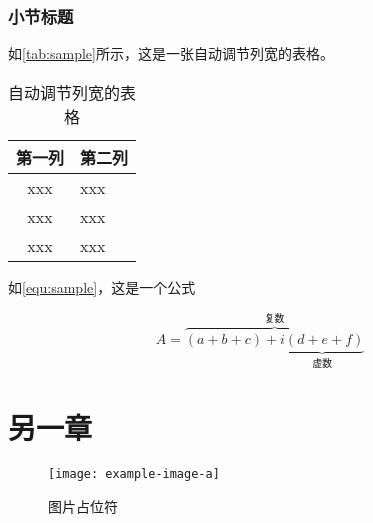 \subsection{小节标题}


\par 如\autoref{tab:sample}所示，这是一张自动调节列宽的表格。

\begin{table}[htbp]
    \caption{\label{tab:sample}自动调节列宽的表格}
    \begin{tabularx}{\linewidth}{c|X<{\centering}}
        \hline
        第一列 & 第二列 \\ \hline
        xxx & xxx \\ \hline
        xxx & xxx \\ \hline
        xxx & xxx \\ \hline
    \end{tabularx}
\end{table}


\par 如\autoref{equ:sample}，这是一个公式

\begin{equation}
    \label{equ:sample}
    A=\overbrace{(a+b+c)+\underbrace{i(d+e+f)}_{\text{虚数}}}^{\text{复数}}
\end{equation}

\chapter{另一章}


\begin{figure}[htbp]
    \centering
    \texttt{[image: example-image-a]}
    \caption{\label{fig:fig-placeholder}图片占位符}
\end{figure} 